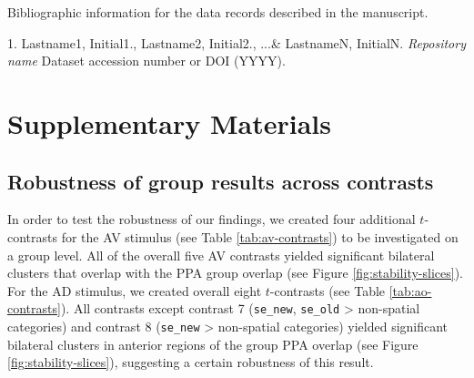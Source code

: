 \documentclass[english]{article}
\begin{document}
Bibliographic information for the data records described in the manuscript.

1. Lastname1, Initial1., Lastname2, Initial2., ...\& LastnameN, InitialN. \emph{Repository name} Dataset accession number or DOI (YYYY).

\appendix

\section{Supplementary Materials}

\subsection{Robustness of group results across contrasts}



In order to test the robustness of our findings, we created four additional
$t$-contrasts for the AV stimulus (see Table \ref{tab:av-contrasts}) to be
investigated on a group level.
All of the overall five AV contrasts yielded significant bilateral clusters that
overlap with the PPA group overlap (see Figure \ref{fig:stability-slices}).
For the AD stimulus, we created overall eight $t$-contrasts (see Table
\ref{tab:ao-contrasts}).
All contrasts except contrast 7 (\texttt{se\_new}, \texttt{se\_old} >
non-spatial categories) and contrast 8 (\texttt{se\_new} > non-spatial
categories) yielded significant bilateral clusters in anterior regions of the
group PPA overlap (see Figure \ref{fig:stability-slices}), suggesting
a certain robustness of this result.

\end{document}
